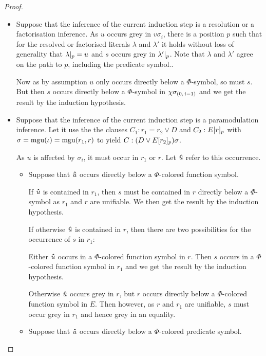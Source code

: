 \documentclass[,%
	draft=false,%
	numbers=noendperiod
	12pt,
	a4paper,
	oneside,%
	openany,
]{memoir}
\newcommand{\inv}{\ensuremath{\chi}}
\begin{document}
\begin{proof}
\begin{itemize}
\begin{itemize}
					\begin{itemize}
						\item
							Suppose that the inference of the current induction step is a resolution or a factorisation inference.
							As $u$ occurs grey in $v\sigma_i$, there is a position $p$ such that for the resolved or factorised literals $\lambda$ and $\lambda'$ it holds without loss of generality that $\lambda|_{p} = u$ and $s$ occurs grey in $\lambda'|_{p}$.
							Note that $\lambda$ and $\lambda'$ agree on the path to $p$, including the predicate symbol..

							Now as by assumption $u$ only occurs directly below a $\Phi$-symbol, so must $s$.
							But then $s$ occurs directly below a $\Phi$-symbol in $\inv\sigmazmi$ and we get the result by the induction hypothesis.

						\item
							Suppose that the inference of the current induction step is a paramodulation inference.
							Let it use the the clauses $C_1: r_1=r_2 \lor D$ and $C_2: E{[r]_{p}}$ with $\sigma=\operatorname{mgu}(\iota)=\operatorname{mgu}(r_1, r)$ to yield $C: (D\lor E{[r_2]_{p}})\sigma$.

							As $u$ is affected by $\sigma_i$, it must occur in $r_1$ or $r$. Let $\bm\hat u$ refer to this occurrence.

							\begin{itemize}
								\item
									Suppose that $\bm\hat u$ occurs directly below a $\Phi$-colored function symbol. 

									If $\bm\hat u$ is contained in $r_1$, then $s$ must be contained in $r$ directly below a $\Phi$-symbol as $r_1$ and $r$ are unifiable. We then get the result by the induction hypothesis.

									If otherwise $\bm\hat u$ is contained in $r$, 
									then there are two possibilities for the occurrence of $s$ in $r_1$:

									Either $\bm\hat u$ occurs in a $\Phi$-colored function symbol in $r$. Then $s$ occurs in a $\Phi$-colored function symbol in $r_1$ and we get the result by the induction hypothesis.

									Otherwise $\bm\hat u$ occurs grey in $r$, but $r$ occurs directly below a $\Phi$-colored function symbol in $E$.
									Then however, as $r$ and $r_1$ are unifiable, $s$ must occur grey in $r_1$ and hence grey in an equality.

								\item
									Suppose that $\bm\hat u$ occurs directly below a $\Phi$-colored predicate symbol. 


\end{itemize}
\end{itemize}
\end{itemize}
\end{itemize}
\end{proof}
\end{document}
